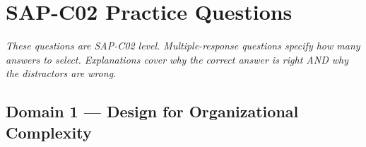 
\section{SAP-C02 Practice Questions}
\label{sec:sap-questions}

\textit{These questions are SAP-C02 level. Multiple-response questions specify how many answers to select. Explanations cover why the correct answer is right AND why the distractors are wrong.}


\subsection{Domain 1 --- Design for Organizational Complexity}

